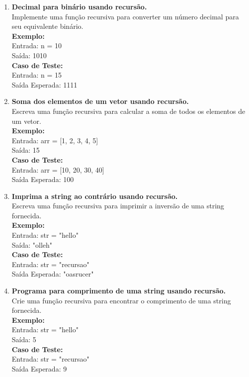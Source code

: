\documentclass[12pt]{article}
\begin{document}
\begin{enumerate}
    \item \textbf{Decimal para binário usando recursão.} \\
    Implemente uma função recursiva para converter um número decimal para seu equivalente binário. \\
    \textbf{Exemplo:} \\
    Entrada: n = 10 \\
    Saída: 1010 \\
    \textbf{Caso de Teste:} \\
    Entrada: n = 15 \\
    Saída Esperada: 1111
    
    \item \textbf{Soma dos elementos de um vetor usando recursão.} \\
    Escreva uma função recursiva para calcular a soma de todos os elementos de um vetor. \\
    \textbf{Exemplo:} \\
    Entrada: arr = [1, 2, 3, 4, 5] \\
    Saída: 15 \\
    \textbf{Caso de Teste:} \\
    Entrada: arr = [10, 20, 30, 40] \\
    Saída Esperada: 100
    
    \item \textbf{Imprima a string ao contrário usando recursão.} \\
    Escreva uma função recursiva para imprimir a inversão de uma string fornecida. \\
    \textbf{Exemplo:} \\
    Entrada: str = "hello" \\
    Saída: "olleh" \\
    \textbf{Caso de Teste:} \\
    Entrada: str = "recursao" \\
    Saída Esperada: "oasrucer"
    
    \item \textbf{Programa para comprimento de uma string usando recursão.} \\
    Crie uma função recursiva para encontrar o comprimento de uma string fornecida. \\
    \textbf{Exemplo:} \\
    Entrada: str = "hello" \\
    Saída: 5 \\
    \textbf{Caso de Teste:} \\
    Entrada: str = "recursao" \\
    Saída Esperada: 9
    

\end{enumerate}
\end{document}
